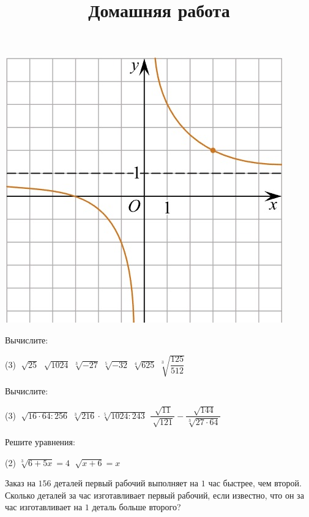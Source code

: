 \begin{consultation}
\begin{listofex}
\begin{minipage}[t]{\picwidth}
			\includegraphics[align=t, width=\textwidth]{../pics/G101M4C5-1.jpg}
		\end{minipage}
	\end{listofex}
		\newpage
		\title{Домашняя работа}
	\begin{listofex}
		\item Вычислите:
		\begin{tasks}(3)
			\task \( \sqrt[]{25} \)
			\task \( \sqrt[]{1024} \)
			\task \( \sqrt[3]{-27} \)
			\task \( \sqrt[5]{-32} \)
			\task \( \sqrt[4]{625} \)
			\task \( \sqrt[3]{\dfrac{125}{512}} \)
		\end{tasks}
		\item Вычислите:
		\begin{tasks}(3)
			\task \( \sqrt[]{16 \cdot 64 : 256} \)
			\task \( \sqrt[3]{216} \cdot \sqrt[5]{1024 : 243} \)
			\task \( \dfrac{\sqrt[]{11}}{\sqrt[]{121}} - \dfrac{\sqrt[]{144}}{\sqrt[3]{27 \cdot 64}} \)
		\end{tasks}
		\item Решите уравнения:
		\begin{tasks}(2)
			\task \( \sqrt[3]{6+5x} = 4 \)
			\task \( \sqrt[]{x+6}=x \)
		\end{tasks}
		\item Заказ на \(156\) деталей первый рабочий выполняет на \(1\) час быстрее, чем второй. Сколько деталей за час изготавливает первый рабочий, если известно, что он за час изготавливает на \(1\) деталь больше второго?
	\end{listofex}
\end{consultation}

